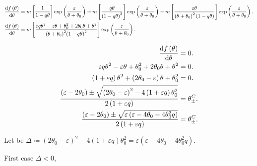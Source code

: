 \documentclass[
    8pt,
    aspectratio=1610,
    c,
    intlimits,
    leqno,
    professionalfonts,
]{beamer}
\begin{document}
\begin{frame}
	\begin{align*}
		\diff{f\left(\theta\right)}{\theta} & =
		m\left[\frac{1}{1-q\theta}\right]
		\exp\left(\frac{\varepsilon}{\theta+\theta_{0}}\right)+
		m\left[\frac{q\theta}{\left(1-q\theta\right)^{2}}\right]
		\exp\left(\frac{\varepsilon}{\theta+\theta_{0}}\right)-
		m\left[\frac{\varepsilon\theta}{{\left(\theta+\theta_{0}\right)}^{2}\left(1-q\theta\right)}\right]
		\exp\left(\frac{\varepsilon}{\theta+\theta_{0}}\right). \\
		\diff{f\left(\theta\right)}{\theta} & =
		m\left[
			\frac{
				\varepsilon q\theta^{2}-
				\varepsilon\theta+
				\theta_{0}^{2}+
				2\theta_{0}\theta+
				\theta^{2}
			}{
				{\left(\theta+\theta_{0}\right)}^{2}
					{\left(1-q\theta\right)}^{2}
			}
			\right]
		\exp\left(\frac{\varepsilon}{\theta+\theta_{0}}\right).
	\end{align*}

	\begin{align*}
		\diff{f\left(\theta\right)}{\theta} & =
		0.                                      \\
		\varepsilon q\theta^{2}-
		\varepsilon\theta+
		\theta_{0}^{2}+
		2\theta_{0}\theta+
		\theta^{2}                          & =
		0.                                      \\
		\left(1+\varepsilon q\right)
		\theta^{2}+
		\left(2\theta_{0}-\varepsilon\right)\theta+
		\theta_{0}^{2}                      & =
		0.                                      \\
		\frac{
			\left(\varepsilon-2\theta_{0}\right)\pm
			\sqrt{{\left(2\theta_{0}-\varepsilon\right)}^{2}-4\left(1+\varepsilon q\right)\theta_{0}^{2}}
		}{
			2\left(1+\varepsilon q\right)
		}
		                                    & =
		\theta^{C}_{\pm}.                       \\
		\frac{
			\left(\varepsilon-2\theta_{0}\right)\pm
			\sqrt{\varepsilon\left(\varepsilon-4\theta_{0}-4\theta_{0}^{2}q\right)}
		}{
			2\left(1+\varepsilon q\right)
		}
		                                    & =
		\theta^{C}_{\pm}.
	\end{align*}

	Let be
	\begin{math}
		\Delta\coloneqq
		{\left(2\theta_{0}-\varepsilon\right)}^{2}-4\left(1+\varepsilon q\right)\theta_{0}^{2}=
		\varepsilon\left(\varepsilon-4\theta_{0}-4\theta_{0}^{2}q\right)
	\end{math}.

	\begin{description}
		\item[First case $\Delta<0$,]


\end{description}
\end{frame}
\end{document}
